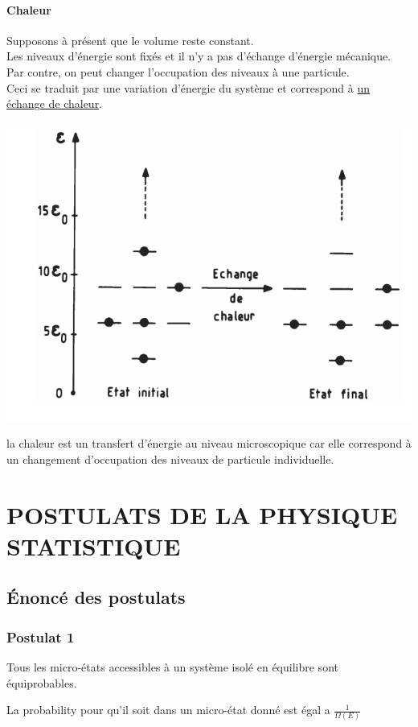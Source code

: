 \documentclass[12pt,oneside]{book}
\begin{document}
\subsubsection{Chaleur}
Supposons à présent que le volume reste constant.\\
Les niveaux d'énergie sont fixés et il n'y a pas d'échange d'énergie mécanique.\\
Par contre, on peut changer l'occupation des niveaux à une particule.\\
Ceci se traduit par une variation d'énergie du système et correspond à \underline{un échange de chaleur}.
\begin{center}
	\includegraphics[width=0.4\linewidth]{../pic/3306/13.png}
\end{center}
la chaleur est un transfert d'énergie au niveau microscopique car elle correspond à un changement d'occupation des niveaux de particule individuelle.
\chapter{POSTULATS DE LA PHYSIQUE STATISTIQUE}
\section{Énoncé des postulats }
\subsection{Postulat 1}
\begin{center}
	Tous les micro-états accessibles à un système isolé en équilibre sont équiprobables.
\end{center}
La probability pour qu'il soit dans un micro-état donné est égal a $\frac{1}{\Omega(E)}$
\end{document}
